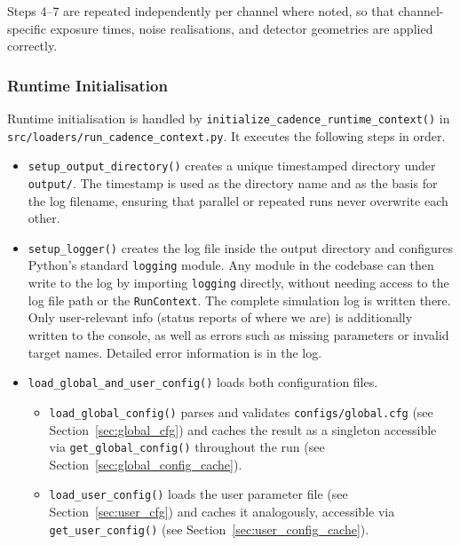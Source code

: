 Steps 4--7 are repeated independently per channel where noted, so that channel-specific exposure times, noise realisations, and detector geometries are applied correctly.


\subsubsection{Runtime Initialisation}
\label{sec:runtime_init}

Runtime initialisation is handled by \texttt{initialize\_cadence\_runtime\_context()} in \texttt{src/loaders/run\_cadence\allowbreak\_context.py}. It executes the following steps in order.

\begin{itemize}

    \item \texttt{setup\_output\_directory()} creates a unique timestamped directory under \texttt{output/}. The timestamp is used as the directory name and as the basis for the log filename, ensuring that parallel or repeated runs never overwrite each other.

    \item \texttt{setup\_logger()} creates the log file inside the output directory and configures Python's standard \texttt{logging} module. Any module in the codebase can then write to the log by importing \texttt{logging} directly, without needing access to the log file path or the \texttt{RunContext}. The complete simulation log is written there. Only user-relevant info (status reports of where we are) is additionally written to the console, as well as errors such as missing parameters or invalid target names. Detailed error information is in the log.

    \item \texttt{load\_global\_and\_user\_config()} loads both configuration files.
          \begin{itemize}
              \item \texttt{load\_global\_config()} parses and validates \texttt{configs/global.cfg} (see Section~\ref{sec:global_cfg}) and caches the result as a singleton accessible via \texttt{get\_global\_config()} throughout the run (see Section~\ref{sec:global_config_cache}).
              \item \texttt{load\_user\_config()} loads the user parameter file (see Section~\ref{sec:user_cfg}) and caches it analogously, accessible via \texttt{get\_user\_config()} (see Section~\ref{sec:user_config_cache}).


\end{itemize}
\end{itemize}
